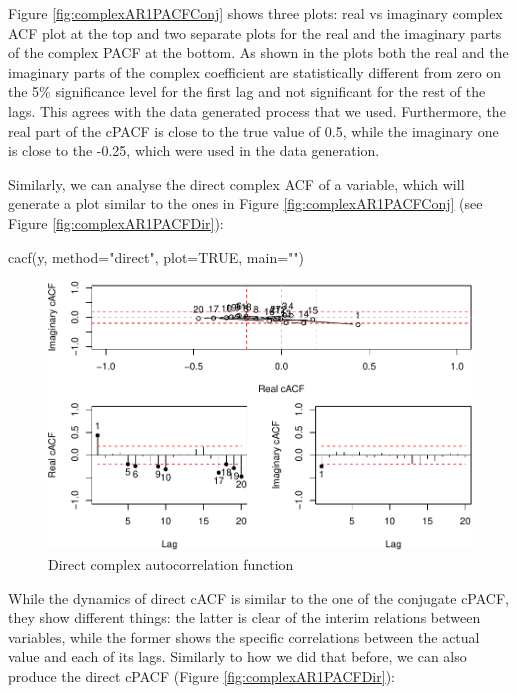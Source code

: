 \documentclass[
]{book}
\newenvironment{Shaded}{\begin{snugshade}}{\end{snugshade}}
\newcommand{\AttributeTok}[1]{\textcolor[rgb]{0.77,0.63,0.00}{#1}}
\newcommand{\ConstantTok}[1]{\textcolor[rgb]{0.00,0.00,0.00}{#1}}
\newcommand{\FunctionTok}[1]{\textcolor[rgb]{0.00,0.00,0.00}{#1}}
\newcommand{\NormalTok}[1]{#1}
\newcommand{\StringTok}[1]{\textcolor[rgb]{0.31,0.60,0.02}{#1}}
\begin{document}
Figure \ref{fig:complexAR1PACFConj} shows three plots: real vs imaginary complex ACF plot at the top and two separate plots for the real and the imaginary parts of the complex PACF at the bottom. As shown in the plots both the real and the imaginary parts of the complex coefficient are statistically different from zero on the 5\% significance level for the first lag and not significant for the rest of the lags. This agrees with the data generated process that we used. Furthermore, the real part of the cPACF is close to the true value of 0.5, while the imaginary one is close to the -0.25, which were used in the data generation.

Similarly, we can analyse the direct complex ACF of a variable, which will generate a plot similar to the ones in Figure \ref{fig:complexAR1PACFConj} (see Figure \ref{fig:complexAR1PACFDir}):

\begin{Shaded}
\begin{Highlighting}[]
\FunctionTok{cacf}\NormalTok{(y, }\AttributeTok{method=}\StringTok{"direct"}\NormalTok{, }\AttributeTok{plot=}\ConstantTok{TRUE}\NormalTok{, }\AttributeTok{main=}\StringTok{""}\NormalTok{)}
\end{Highlighting}
\end{Shaded}

\begin{figure}
\centering
\includegraphics{Svetunkov---Svetunkov---Complex-Valued-Econometrics_files/figure-latex/complexAR1ACFDir-1.pdf}
\caption{\label{fig:complexAR1ACFDir}Direct complex autocorrelation function}
\end{figure}

While the dynamics of direct cACF is similar to the one of the conjugate cPACF, they show different things: the latter is clear of the interim relations between variables, while the former shows the specific correlations between the actual value and each of its lags. Similarly to how we did that before, we can also produce the direct cPACF (Figure \ref{fig:complexAR1PACFDir}):
\end{document}
